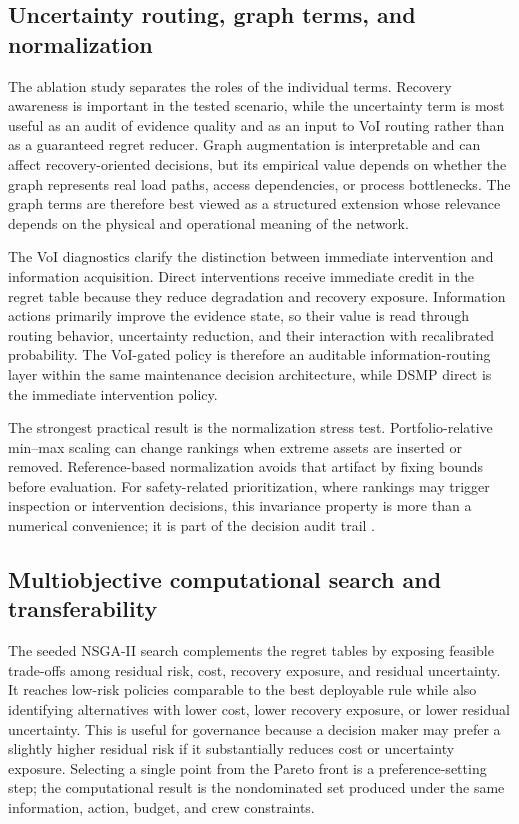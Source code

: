 \documentclass[cmes,article,submit,moreauthors,pdftex]{Definitions/tsp}
\begin{document}
\subsection{Uncertainty routing, graph terms, and normalization}

The ablation study separates the roles of the individual terms. Recovery awareness is important in the tested scenario, while the uncertainty term is most useful as an audit of evidence quality and as an input to VoI routing rather than as a guaranteed regret reducer. Graph augmentation is interpretable and can affect recovery-oriented decisions, but its empirical value depends on whether the graph represents real load paths, access dependencies, or process bottlenecks. The graph terms are therefore best viewed as a structured extension whose relevance depends on the physical and operational meaning of the network.

The VoI diagnostics clarify the distinction between immediate intervention and information acquisition. Direct interventions receive immediate credit in the regret table because they reduce degradation and recovery exposure. Information actions primarily improve the evidence state, so their value is read through routing behavior, uncertainty reduction, and their interaction with recalibrated probability. The VoI-gated policy is therefore an auditable information-routing layer within the same maintenance decision architecture, while DSMP direct is the immediate intervention policy.

The strongest practical result is the normalization stress test. Portfolio-relative min--max scaling can change rankings when extreme assets are inserted or removed. Reference-based normalization avoids that artifact by fixing bounds before evaluation. For safety-related prioritization, where rankings may trigger inspection or intervention decisions, this invariance property is more than a numerical convenience; it is part of the decision audit trail \cite{kaplan1981,faber2005}.

\subsection{Multiobjective computational search and transferability}

The seeded NSGA-II search complements the regret tables by exposing feasible trade-offs among residual risk, cost, recovery exposure, and residual uncertainty. It reaches low-risk policies comparable to the best deployable rule while also identifying alternatives with lower cost, lower recovery exposure, or lower residual uncertainty. This is useful for governance because a decision maker may prefer a slightly higher residual risk if it substantially reduces cost or uncertainty exposure. Selecting a single point from the Pareto front is a preference-setting step; the computational result is the nondominated set produced under the same information, action, budget, and crew constraints.
\end{document}
